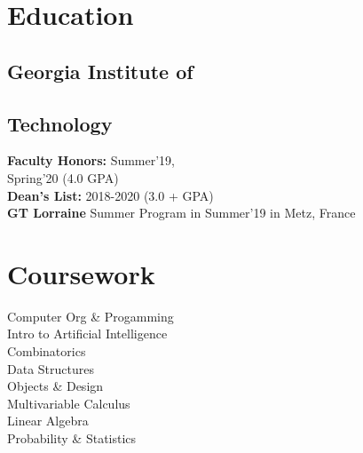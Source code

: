 \documentclass[]{saumya-resume}
\begin{document}
%
%
\lastupdated

%
%

%
%

\begin{minipage}[t]{0.33\textwidth} 


\section{Education} 

\subsection{Georgia Institute of}
\subsection{Technology}
\vskip 0.05in
\vskip 0.05in
{\bf Faculty Honors:} Summer'19,\\
Spring'20 (4.0 GPA)\\
{\bf Dean's List:} 2018-2020 (3.0 + GPA) \\
{\bf GT Lorraine} Summer Program in Summer'19 in Metz, France
\sectionsep


\section{Coursework}
Computer Org \& Progamming \\
Intro to Artificial Intelligence \\
Combinatorics \\
Data Structures \\
Objects \& Design \\
Multivariable Calculus \\
Linear Algebra \\
Probability \& Statistics\\
\sectionsep


\end{minipage}
\end{document}
